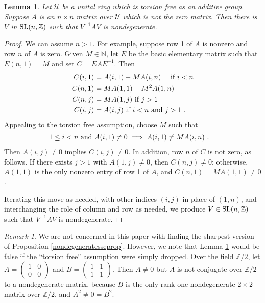 \documentclass{amsart}
\newtheorem{lemma}[theorem]{Lemma}
\theoremstyle{definition}
\theoremstyle{remark}
\newtheorem{remark}[theorem]{Remark}
\numberwithin{equation}{section}
\begin{document}
{{\begin{lemma} \label{nozerotonondegenerate} 
Let $\mathcal U$ be a unital ring which is torsion free 
as an additive group. Suppose $A$ is an $n\times n$ matrix 
over $\mathcal U$ which is not the zero matrix. 
Then there is $V$ in $\textnormal{SL}(n,\mathbb Z)$ such that 
$V^{-1}AV$ is nondegenerate. 
\end{lemma} 
\begin{proof} We can assume $n>1$.  
For example, suppose row 1 of $A$ is nonzero and 
row $n$ of $A$ is zero. Given $M\in \mathbb N$, 
let $E$ be the basic elementary matrix such that 
$E(n,1)=M$ and set  $C= EAE^{-1}$. Then 
\begin{align*} 
C (i,1) &= A(i,1) - MA(i,n) \quad 
\textnormal{ if } i<n \\ 
C(n,1) & = MA(1,1)-M^2A(1,n) \\ 
C(n,j) & = MA(1,j) 
\textnormal{ if } j>1 \\ 
C(i,j) & = A(i,j) 
\textnormal{ if } i<n 
\textnormal{ and } j>1 \ .  
\end{align*} 
Appealing to the torsion free assumption, 
choose $M$ such that 
\begin{align*} 
1\leq i < n \textnormal{ and }  
A(i,1)\neq 0 
& \implies 
A(i,1) \neq MA(i,n) 
\ . 
\end{align*} 
Then $A(i,j)\neq 0 $ implies $C(i,j)\neq 0$. 
In addition, row $n$ of $C$ is not zero, as follows.
If there exists $j>1$ with $A(1,j)\neq 0$, then 
$C(n,j)\neq 0$; otherwise, $A(1,1)$ is the 
only nonzero entry of row 1 of $A$, and 
$C(n,1) = MA(1,1) \neq 0$. 

Iterating this move as needed, with 
other indices $(i,j)$ in place of $(1,n)$, 
and interchanging the role of column and row as needed, 
we produce $V\in \textnormal{SL}(n,\mathbb Z)$ such that $V^{-1}AV$ 
is nondegenerate. 

\end{proof} 

\begin{remark} 
We are not concerned in this paper with finding the 
sharpest version of Proposition \ref{nondegeneratesseprop}.
However, we note that Lemma \ref{nozerotonondegenerate} would be false if 
the ``torsion free'' assumption were simply dropped. 
Over the field $\mathbb Z/2$, let 
$A= 
\left(
\begin{smallmatrix} 1 & 0 \\ 0 & 0 
\end{smallmatrix}
\right)$ and 
$B= \left(
\begin{smallmatrix} 1 & 1 \\ 1 & 1 
\end{smallmatrix}
\right)
$. 
Then $A\neq 0$ but $A$ is not conjugate over $\mathbb Z/2$ to 
a nondegenerate matrix, because $B$ is the only rank one 
nondegenerate $2\times 2$ matrix over $\mathbb Z/2$, and 
$A^2 \neq 0 = B^2$. 
\end{remark} 

}}
\end{document}
